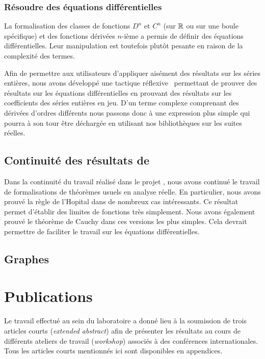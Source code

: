 \documentclass[11pt]{article}
\begin{document}
\subsubsection{Résoudre des équations différentielles}

La formalisation des classes de fonctions $D^n$ et $C^n$ (sur $\mathbb{R}$ ou sur une boule
spécifique) et des fonctions dérivées $n$-ième a permis de définir des équations
différentielles. Leur manipulation est toutefois plutôt pesante en raison de la
complexité des termes.

Afin de permettre aux utilisateurs d'appliquer aisément des résultats sur les séries
entières, nous avons développé une tactique réflexive~\cite{reflection} permettant
de prouver des résultats sur les équations différentielles en prouvant des résultats
sur les coefficients des séries entières en jeu.
D'un terme complexe comprenant des dérivées d'ordres différents nous passons donc
à une expression plus simple qui pourra à son tour être déchargée en utilisant nos
bibliothèques sur les suites réelles.

\subsection{Continuité des résultats de \coquille{}}

Dans la continuité du travail réalisé dans le projet \coquille{}, nous avons continué 
le travail de formalisations de théorèmes usuels en analyse réelle. En particulier, 
nous avons prouvé la règle de l'Hopital dans de nombreux cas intéressants. Ce résultat 
permet d'établir des limites de fonctions très simplement. Nous avons également  
prouvé le théorème de Cauchy dans ces versions les plus simples. Cela devrait permettre 
de faciliter le travail sur les équations différentielles. 

\subsection{Graphes}

\section{Publications}

Le travail effectué au sein du laboratoire \coqtail{} a donné lieu à la soumission
de trois articles courts (\textit{extended abstract}) afin de présenter les résultats
au cours de différents ateliers de travail (\textit{workshop}) associés à des
conférences internationales. Tous les articles courts mentionnés ici sont disponibles
en appendices.
\end{document}
